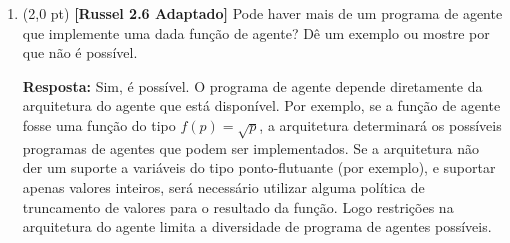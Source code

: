 \documentclass[12pt,a4paper,oneside]{article}
\begin{document}
\begin{enumerate}
		\begin{enumerate}
		\item[] I - A primeira solução encontrada pela estratégia de busca em largura é a solução ótima. 
		{\color{blue} VERDADEIRO. }
		\item[] II - A primeira solução encontrada pela estratégia de busca em profundidade é a solução ótima. \\
		{\color{blue} FALSO, pois a solução ótima pode estar em níveis acima da primeira solução encontrada, em nós que ainda não foram visitados.}
		\item[] III - As estratégias de busca com informação usam funções heurísticas que, quando bem definidas, permitem
		melhorar a eficiência da busca. {\color{blue} VERDADEIRO. }
		\item[] IV - A estratégia de busca gulosa é eficiente porque expande apenas os nós que estão no caminho da
		solução.\\
		{\color{blue} FALSO, pois embora ela expande apenas os nós que estão (aparentemente) no caminho da solução, ela não é a opção mais eficiente. A busca A* é um opção melhor, por exemplo.}
	\end{enumerate}
	
	Estão certos apenas os itens:
	
	\begin{enumerate}
		\item I e II.
		\item I e III. {\color{blue} Resposta correta.}
		\item I e IV.
		\item II e IV.
		\item III e IV.
	\end{enumerate}
	
	 \item (2,0 pt) {\bf [Russel 2.6 Adaptado]} Pode haver mais de um programa de agente que implemente uma
	dada função de agente? Dê um exemplo ou mostre por que não é
	possível.
	
	\vspace*{0.3cm}
	
	{\color{blue} 
		{\bf Resposta:} Sim, é possível. O programa de agente depende diretamente da arquitetura do agente que está disponível. Por exemplo, se a função de agente fosse uma função do tipo $f(p) = \sqrt{p}$, a arquitetura determinará os possíveis programas de agentes que podem ser implementados. Se a arquitetura não der um suporte a variáveis do tipo ponto-flutuante (por exemplo), e suportar apenas valores inteiros, será necessário utilizar alguma política de truncamento de valores para o resultado da função. Logo restrições na arquitetura do agente limita a diversidade de programa de agentes possíveis.
	}
	

\end{enumerate}
\end{document}
